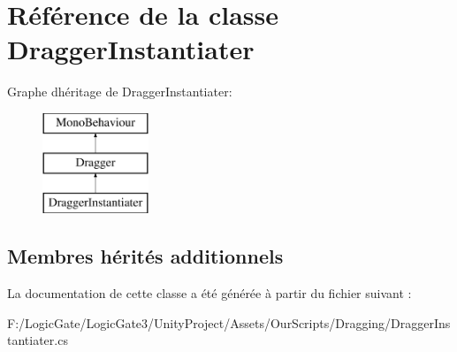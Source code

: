 \hypertarget{class_dragger_instantiater}{}\section{Référence de la classe Dragger\+Instantiater}
\label{class_dragger_instantiater}
Graphe d\textquotesingle{}héritage de Dragger\+Instantiater\+:\begin{figure}[H]
\begin{center}
\leavevmode
\includegraphics[height=3.000000cm]{class_dragger_instantiater}
\end{center}
\end{figure}
\subsection*{Membres hérités additionnels}


La documentation de cette classe a été générée à partir du fichier suivant \+:\begin{DoxyCompactItemize}
\item 
F\+:/\+Logic\+Gate/\+Logic\+Gate3/\+Unity\+Project/\+Assets/\+Our\+Scripts/\+Dragging/Dragger\+Instantiater.\+cs\end{DoxyCompactItemize}
